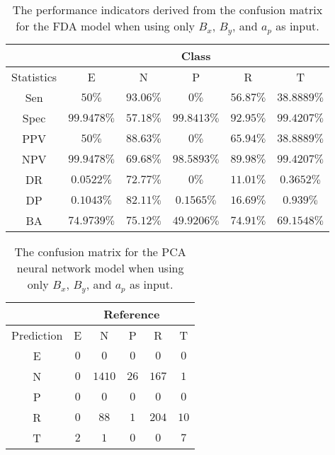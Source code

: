 \begin{table}[!ht]
	\centering
	\begin{tabular}{|c|c|c|c|c|c|}
		\hline
		 & \multicolumn{5}{c|}{Class} \\ \hline
		Statistics & E & N & P & R & T \\ \hline
		Sen & $50\%$ & $93.06\%$ & $0\%$ & $56.87\%$ & $38.8889\%$ \\ \hline
		Spec & $99.9478\%$ & $57.18\%$ & $99.8413\%$ & $92.95\%$ & $99.4207\%$ \\ \hline
		PPV & $50\%$ & $88.63\%$ & $0\%$ & $65.94\%$ & $38.8889\%$ \\ \hline
		NPV & $99.9478\%$ & $69.68\%$ & $98.5893\%$ & $89.98\%$ & $99.4207\%$ \\ \hline
		DR & $0.0522\%$ & $72.77\%$ & $0\%$ & $11.01\%$ & $0.3652\%$ \\ \hline
		DP & $0.1043\%$ & $82.11\%$ & $0.1565\%$ & $16.69\%$ & $0.939\%$ \\ \hline
		BA & $74.9739\%$ & $75.12\%$ & $49.9206\%$ & $74.91\%$ & $69.1548\%$ \\ \hline
	\end{tabular}
	\caption{The performance indicators derived from the confusion matrix for the FDA model when using only $B_{x}$, $B_{y}$, and $a_{p}$ as input.}
	\label{tab:cs:reverse:xyap:fda}
\end{table}

\begin{table}[!ht]
	\centering
	\begin{tabular}{|c|c|c|c|c|c|}
		\hline
		 & \multicolumn{5}{|c|}{Reference} \\ \hline
		 Prediction & E & N & P & R & T \\ \hline
		 E & $0$ & $0$ & $0$ & $0$ & $0$ \\ \hline
		 N & $0$ & $1410$ & $26$ & $167$ & $1$ \\ \hline
		 P & $0$ & $0$ & $0$ & $0$ & $0$ \\ \hline
		 R & $0$ & $88$ & $1$ & $204$ & $10$ \\ \hline
		 T & $2$ & $1$ & $0$ & $0$ & $7$ \\ \hline
	\end{tabular}
	\caption{The confusion matrix for the PCA neural network model when using only $B_{x}$, $B_{y}$, and $a_{p}$ as input.}
	\label{tab:cm:xyap:pcaNNet}
\end{table}

